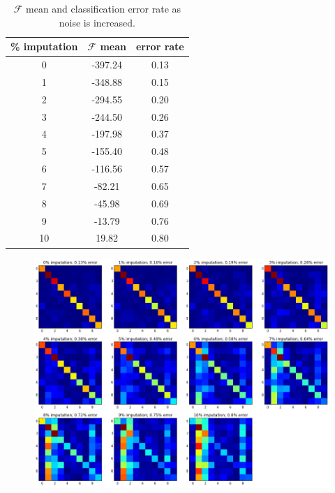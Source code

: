 \documentclass{report}
\begin{document}
\begin{table}[h!]
	\begin{center}
		\begin{tabular}{c | c | c}
		\% imputation & $\mathcal{F}$ mean & error rate \\
		\hline
		0 & -397.24 & 0.13 \\
		1 & -348.88 & 0.15 \\
		2 & -294.55 & 0.20 \\
		3 & -244.50 & 0.26 \\
		4 & -197.98 & 0.37 \\
		5 & -155.40 & 0.48 \\
		6 & -116.56 & 0.57 \\
		7 & -82.21 & 0.65 \\
		8 & -45.98 & 0.69 \\
		9 & -13.79 & 0.76 \\
		10 & 19.82 & 0.80 \\
		
		\end{tabular}
	\end{center}
	\caption{$\mathcal{F}$ mean and classification error rate as noise is increased.}
\end{table}


\begin{figure}
\begin{center}
\includegraphics[width=\textwidth]{confusion_matrices}
\end{center}
\end{figure}
\end{document}
